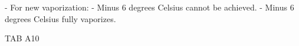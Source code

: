- For new vaporization:  
  - Minus 6 degrees Celsius cannot be achieved.  
  - Minus 6 degrees Celsius fully vaporizes.  

TAB A10